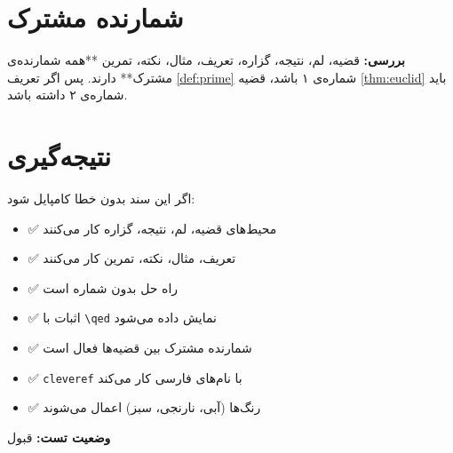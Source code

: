 \documentclass{matinbook}
\begin{document}
\section{شمارنده مشترک}
\label{sec:shared-counter}

\textbf{بررسی:} قضیه، لم، نتیجه، گزاره، تعریف، مثال، نکته،
تمرین **همه شمارنده‌ی مشترک** دارند. پس اگر تعریف \ref{def:prime}
شماره‌ی ۱ باشد، قضیه \ref{thm:euclid} باید شماره‌ی ۲ داشته باشد.

\section{نتیجه‌گیری}
\label{sec:conclusion}

اگر این سند بدون خطا کامپایل شود:

\begin{itemize}
    \item ✅ محیط‌های قضیه، لم، نتیجه، گزاره کار می‌کنند
    \item ✅ تعریف، مثال، نکته، تمرین کار می‌کنند
    \item ✅ راه حل بدون شماره است
    \item ✅ اثبات با \texttt{\textbackslash qed} نمایش داده می‌شود
    \item ✅ شمارنده مشترک بین قضیه‌ها فعال است
    \item ✅ \texttt{cleveref} با نام‌های فارسی کار می‌کند
    \item ✅ رنگ‌ها (آبی، نارنجی، سبز) اعمال می‌شوند
\end{itemize}

\textbf{وضعیت تست:} قبول
\end{document}

